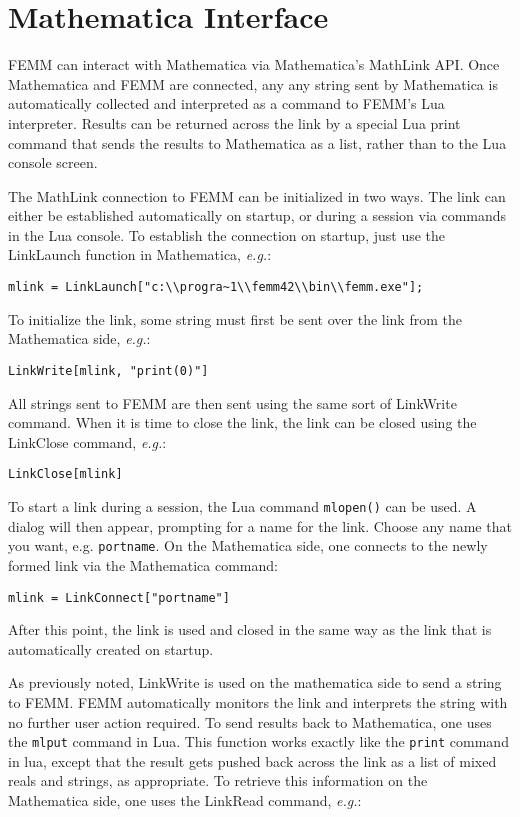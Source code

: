 \chapter{Mathematica Interface}

FEMM can interact with Mathematica via Mathematica's MathLink API. Once Mathematica and FEMM are connected, any
any string sent by Mathematica is automatically collected and interpreted as a command to FEMM's Lua interpreter.
Results can be returned across the link by a special Lua print command that sends the results to Mathematica
as a list, rather than to the Lua console screen.

The MathLink connection to FEMM can be initialized in two ways.  The link can either be established
automatically on startup, or during a session via commands in the Lua console.  To establish the connection on
startup, just use the LinkLaunch function in Mathematica, {\em e.g.}:

\verb+mlink = LinkLaunch["c:\\progra~1\\femm42\\bin\\femm.exe"];+

To initialize the link, some string must first be sent over the link from the Mathematica side, {\em e.g.}:

\verb+LinkWrite[mlink, "print(0)"]+

All strings sent to FEMM are then sent using the same sort of LinkWrite command. When it is time to close the link,
the link can be closed using the LinkClose command, {\em e.g.}:

\verb+LinkClose[mlink]+

To start a link during a session, the Lua command {\tt mlopen()} can be used.  A dialog will then appear, prompting
for a name for the link.  Choose any name that you want, e.g. {\tt portname}.  On the Mathematica side, one connects
to the newly formed link via the Mathematica command:

\verb+mlink = LinkConnect["portname"]+

After this point, the link is used and closed in the same way as the link that is automatically created on startup.

As previously noted, LinkWrite is used on the mathematica side to send a string to FEMM.  FEMM automatically monitors
the link and interprets the string with no further user action required.  To send results back to Mathematica, one
uses the {\tt mlput} command in Lua.  This function works exactly like the {\tt print} command in lua, except that
the result gets pushed back across the link as a list of mixed reals and strings, as appropriate.  To retrieve this
information on the Mathematica side, one uses the LinkRead command, {\em e.g.}:

